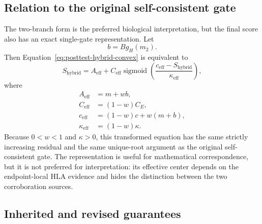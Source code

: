 \documentclass[11pt]{article}
\newcommand{\sigmoid}{\operatorname{sigmoid}}
\begin{document}
\subsection{Relation to the original self-consistent gate}

The two-branch form is the preferred biological interpretation, but the final
score also has an exact single-gate representation. Let
\begin{equation}
b=B g_H(m_2).
\end{equation}
Then Equation~\eqref{eq:posttest-hybrid-convex} is equivalent to
\begin{equation}
S_{\mathrm{hybrid}}
=A_{\mathrm{eff}}
+C_{\mathrm{eff}}
\sigmoid\left(
  \frac{c_{\mathrm{eff}}-S_{\mathrm{hybrid}}}
       {\kappa_{\mathrm{eff}}}
\right),
\label{eq:posttest-effective-self-gate}
\end{equation}
where
\begin{align}
A_{\mathrm{eff}}&=m+wb,\\
C_{\mathrm{eff}}&=(1-w)C_E,\\
c_{\mathrm{eff}}&=(1-w)c+w(m+b),\\
\kappa_{\mathrm{eff}}&=(1-w)\kappa.
\end{align}
Because $0<w<1$ and $\kappa>0$, this transformed equation has the same
strictly increasing residual and the same unique-root argument as the
original self-consistent gate. The representation is useful for mathematical
correspondence, but it is not preferred for interpretation: its effective
center depends on the endpoint-local HLA evidence and hides the distinction
between the two corroboration sources.

\subsection{Inherited and revised guarantees}
\end{document}
